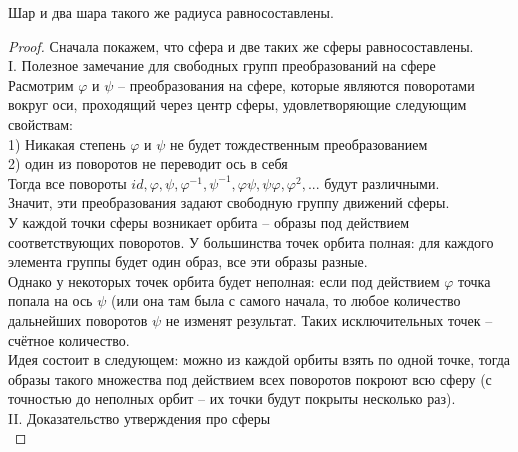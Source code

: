 \begin{theorem}
    Шар и два шара такого же радиуса равносоставлены.
    
    \begin{proof}
        
        Сначала покажем, что сфера и две таких же сферы равносоставлены.\\
        
        I. Полезное замечание для свободных групп преобразований на сфере\\
        
        Расмотрим $\varphi$ и $\psi$ -- преобразования на сфере, которые являются поворотами вокруг оси, проходящий через центр сферы, удовлетворяющие следующим свойствам:\\
        
        1) Никакая степень $\varphi$ и $\psi$ не будет тождественным преобразованием\\
        2) один из поворотов не переводит ось в себя\\
        
        Тогда все повороты $id, \varphi, \psi, \varphi^{-1}, \psi^{-1}, \varphi \psi, \psi \varphi, \varphi^2, ...$ будут различными.\\
        
        Значит, эти преобразования задают свободную группу движений сферы.\\
        
        У каждой точки сферы возникает орбита -- образы под действием соответствующих поворотов. У большинства точек орбита полная: для каждого элемента группы будет один образ, все эти образы разные.\\
        
        Однако у некоторых точек орбита будет неполная: если под действием $\varphi$ точка попала на ось $\psi$ (или она там была с самого начала, то любое количество дальнейших поворотов $\psi$ не изменят результат. Таких исключительных точек -- счётное количество.\\
        
        Идея состоит в следующем: можно из каждой орбиты взять по одной точке, тогда образы такого множества под действием всех поворотов покроют всю сферу (с точностью до неполных орбит -- их точки будут покрыты несколько раз).\\
        
        II. Доказательство утверждения про сферы\\
        

\end{proof}
\end{theorem}
